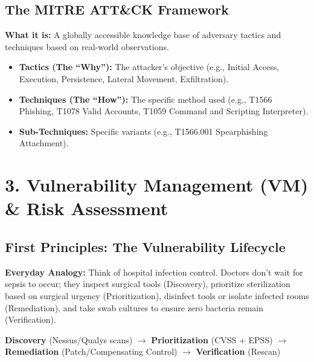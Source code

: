 \documentclass[10pt,a4paper]{article}
\begin{document}
\subsection{The MITRE ATT\&CK Framework}
\textbf{What it is:} A globally accessible knowledge base of adversary tactics and techniques based on real-world observations.
\begin{itemize}[noitemsep]
    \item \textbf{Tactics (The ``Why''):} The attacker's objective (e.g., Initial Access, Execution, Persistence, Lateral Movement, Exfiltration).
    \item \textbf{Techniques (The ``How''):} The specific method used (e.g., T1566 Phishing, T1078 Valid Accounts, T1059 Command and Scripting Interpreter).
    \item \textbf{Sub-Techniques:} Specific variants (e.g., T1566.001 Spearphishing Attachment).
\end{itemize}

\section{3. Vulnerability Management (VM) \& Risk Assessment}

\subsection{First Principles: The Vulnerability Lifecycle}
\textbf{Everyday Analogy:} Think of hospital infection control. Doctors don't wait for sepsis to occur; they inspect surgical tools (Discovery), prioritize sterilization based on surgical urgency (Prioritization), disinfect tools or isolate infected rooms (Remediation), and take swab cultures to ensure zero bacteria remain (Verification).

\begin{center}
\textbf{Discovery} (Nessus/Qualys scans) $\longrightarrow$ \textbf{Prioritization} (CVSS + EPSS) $\longrightarrow$ \textbf{Remediation} (Patch/Compensating Control) $\longrightarrow$ \textbf{Verification} (Rescan)
\end{center}
\end{document}
